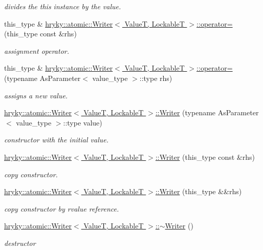 \begin{DoxyCompactItemize}
\begin{DoxyCompactList}\small\item\em divides the this instance by the value. \end{DoxyCompactList}\item 
this\-\_\-type \& \hyperlink{group__atomic__operation_gab5e4c7b8fa6d6c4e791f7f8f651de97f}{hryky\-::atomic\-::\-Writer$<$ Value\-T, Lockable\-T $>$\-::operator=} (this\-\_\-type const \&rhs)
\begin{DoxyCompactList}\small\item\em assignment operator. \end{DoxyCompactList}\item 
this\-\_\-type \& \hyperlink{group__atomic__operation_gabe02d1a1584c488c8b71e49ff212235e}{hryky\-::atomic\-::\-Writer$<$ Value\-T, Lockable\-T $>$\-::operator=} (typename As\-Parameter$<$ value\-\_\-type $>$\-::type rhs)
\begin{DoxyCompactList}\small\item\em assigns a new value. \end{DoxyCompactList}\item 
\hyperlink{group__atomic__operation_gac68031a9e2acf0fd451ef9daa9e5efd2}{hryky\-::atomic\-::\-Writer$<$ Value\-T, Lockable\-T $>$\-::\-Writer} (typename As\-Parameter$<$ value\-\_\-type $>$\-::type value)
\begin{DoxyCompactList}\small\item\em constructor with the initial value. \end{DoxyCompactList}\item 
\hyperlink{group__atomic__operation_gac0872ceccd99b51c0f258fe05deca6c0}{hryky\-::atomic\-::\-Writer$<$ Value\-T, Lockable\-T $>$\-::\-Writer} (this\-\_\-type const \&rhs)
\begin{DoxyCompactList}\small\item\em copy constructor. \end{DoxyCompactList}\item 
\hypertarget{group__atomic__operation_ga2f399901b313d5e92f891e24d08f3079}{\hyperlink{group__atomic__operation_ga2f399901b313d5e92f891e24d08f3079}{hryky\-::atomic\-::\-Writer$<$ Value\-T, Lockable\-T $>$\-::\-Writer} (this\-\_\-type \&\&rhs)}\label{group__atomic__operation_ga2f399901b313d5e92f891e24d08f3079}

\begin{DoxyCompactList}\small\item\em copy constructor by rvalue reference. \end{DoxyCompactList}\item 
\hyperlink{group__atomic__operation_ga93eb8e0b170241286e90fec300b48d9a}{hryky\-::atomic\-::\-Writer$<$ Value\-T, Lockable\-T $>$\-::$\sim$\-Writer} ()
\begin{DoxyCompactList}\small\item\em destructor \end{DoxyCompactList}\end{DoxyCompactItemize}


